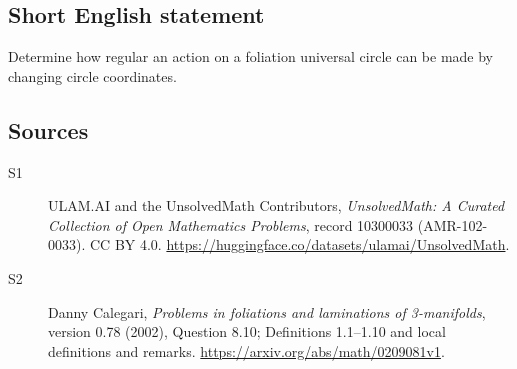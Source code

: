 \documentclass[11pt]{article}
\begin{document}
\subsection{Short English statement}
Determine how regular an action on a foliation universal circle can be made by changing circle coordinates.
\subsection{Sources}
\begin{description}
\item[\hypertarget{source:10300033:1}{S1}] ULAM.AI and the UnsolvedMath Contributors, \emph{UnsolvedMath: A Curated Collection of Open Mathematics Problems}, record 10300033 (AMR-102-0033). CC BY 4.0. \url{https://huggingface.co/datasets/ulamai/UnsolvedMath}.
\item[\hypertarget{source:10300033:2}{S2}] Danny Calegari, \emph{Problems in foliations and laminations of 3-manifolds}, version 0.78 (2002), Question 8.10; Definitions 1.1--1.10 and local definitions and remarks. \url{https://arxiv.org/abs/math/0209081v1}.
\end{description}
\label{end:10300033}
\end{document}
